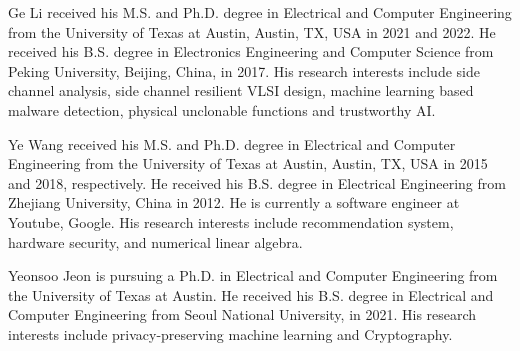 \documentclass[9.5pt,journal,compsoc]{IEEEtran}
\begin{document}
\begin{IEEEbiography}%
{Ge Li}
received his M.S. and Ph.D. degree in Electrical and Computer Engineering from the University of Texas at Austin, Austin, TX, USA in 2021 and 2022. He received his B.S. degree in Electronics Engineering and Computer Science from Peking University, Beijing, China, in 2017. His research interests include side channel analysis, side channel resilient VLSI design, machine learning based malware detection, physical unclonable functions and trustworthy AI.
\end{IEEEbiography}

\begin{IEEEbiography}%
{Ye Wang}
received his M.S. and Ph.D. degree in Electrical and Computer Engineering from the University of Texas at Austin, Austin, TX, USA in 2015 and 2018, respectively. 
He received his B.S. degree in Electrical Engineering from Zhejiang University, China in 2012.
He is currently a software engineer at Youtube, Google. 
His research interests include recommendation system, hardware security, and numerical linear algebra.
\end{IEEEbiography}

\begin{IEEEbiography}%
{Yeonsoo Jeon}
is pursuing a Ph.D. in Electrical and Computer Engineering from the University of Texas at Austin. He received his B.S. degree in Electrical and Computer Engineering from Seoul National University, in 2021. His research interests include privacy-preserving machine learning and Cryptography.
\end{IEEEbiography}
\end{document}
